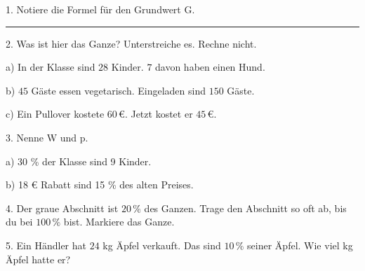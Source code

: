 \documentclass[11pt]{article}
\let\gkopf\empty
\newcommand{\gueber}[1]{\gdef\gkopf{#1}}
\newlength{\gEin}\setlength{\gEin}{0pt}
\newcommand{\gzwei}[2]{\par\smallskip\noindent\sbox{\gbox}{#1}%
  \setlength{\gLinks}{\dimexpr0.5\textwidth-\gEin-\mbpfnr\relax}%
  \ifdim\wd\gbox>\dimexpr\gLinks-4mm\relax
    \usebox{\gbox}\par\smallskip\noindent\begin{minipage}{\linewidth}#2\end{minipage}%
  \else
    \begin{minipage}[c]{\gLinks}\usebox{\gbox}\end{minipage}%
    \begin{minipage}[c]{\dimexpr\linewidth-\gLinks\relax}\raggedright #2\end{minipage}%
  \fi\par}
\begin{document}
\pfheftstil
\fancyfoot[C]{\parbox[t]{\textwidth}{\mbfhbox\par\vspace{1.5mm}{\footnotesize\color{mbgrau}{\scriptsize 3Z2}\hfill\thepage}}}
\begin{pfaufg}{}{1.}{}
Notiere die Formel für den Grundwert G.\hfill{\color{black!45}\rule[-1pt]{0.45\linewidth}{0.4pt}}
\end{pfaufg}
\begin{pfaufg}{}{2.}{}
Was ist hier das Ganze? Unterstreiche es. Rechne nicht.\par\smallskip\noindent a) In der Klasse sind $28$ Kinder. $7$ davon haben einen Hund.\par\noindent b) $45$ Gäste essen vegetarisch. Eingeladen sind $150$ Gäste.\par\noindent c) Ein Pullover kostete $60\,€$. Jetzt kostet er $45\,€$.
\end{pfaufg}
\begin{pfaufg}{}{3.}{}
Nenne W und p.\par\smallskip\noindent a) 30 \% der Klasse sind 9 Kinder.\par\vspace{6mm}\noindent{\color{black!45}\rule{\linewidth}{0.4pt}}\par\smallskip\noindent b) 18 € Rabatt sind 15 \% des alten Preises.\par\vspace{6mm}\noindent{\color{black!45}\rule{\linewidth}{0.4pt}}
\end{pfaufg}
\par\addvspace{6pt}\gueber{\vspace{10pt}{\large\bfseries Vom Teil zum Ganzen}\par\vspace{2pt}}
\begin{pfaufg}{}{4.}{}
Der graue Abschnitt ist $20\,\%$ des Ganzen. Trage den Abschnitt so oft ab, bis du bei $100\,\%$ bist. Markiere das Ganze.
\gzwei{\streifen[0]{20}{$0\,\%$}{}}{\par\noindent \leerfeld[Abschnitte] \par}
\end{pfaufg}
\begin{pfaufg}{}{5.}{}
Ein Händler hat $24$ kg Äpfel verkauft. Das sind $10\,\%$ seiner Äpfel. Wie viel kg Äpfel hatte er?
\par\noindent \leerfeld[kg] \par
{}
\end{pfaufg}
\end{document}
